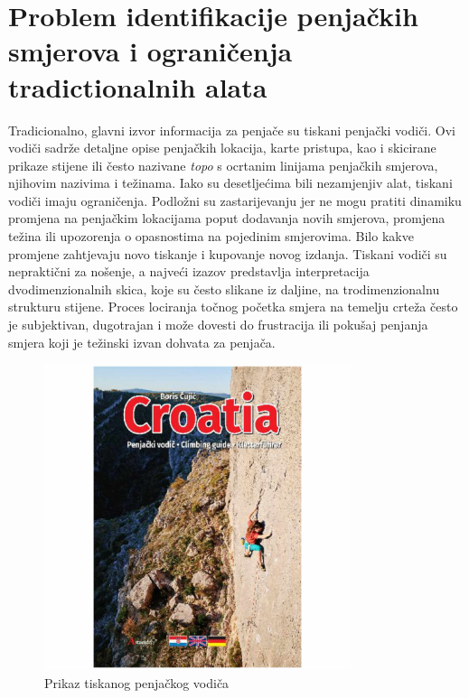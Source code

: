 \section{Problem identifikacije penjačkih smjerova i ograničenja tradictionalnih alata}

Tradicionalno, glavni izvor informacija za penjače su tiskani penjački vodiči. Ovi vodiči sadrže detaljne opise penjačkih lokacija, karte pristupa, kao i skicirane prikaze stijene ili često nazivane \textit{topo} s ocrtanim linijama penjačkih smjerova, njihovim nazivima i težinama. Iako su desetljećima bili nezamjenjiv alat, tiskani vodiči imaju ograničenja. 
Podložni su zastarijevanju jer ne mogu pratiti dinamiku promjena na penjačkim lokacijama poput dodavanja novih smjerova, promjena težina ili upozorenja o opasnostima na pojedinim smjerovima. Bilo kakve promjene zahtjevaju novo tiskanje i kupovanje novog izdanja. Tiskani vodiči su nepraktični za nošenje, a najveći izazov predstavlja interpretacija dvodimenzionalnih skica, koje su često slikane iz daljine, na trodimenzionalnu strukturu stijene. Proces lociranja točnog početka smjera na temelju crteža često je subjektivan, dugotrajan i može dovesti do frustracija ili pokušaj penjanja smjera koji je težinski izvan dohvata za penjača. 

\begin{figure}[H]
    \centering
    \includegraphics[width=0.8\textwidth]{images/uvod/tradicionalni_vodic.jpg}
    \caption{Prikaz tiskanog penjačkog vodiča}
\end{figure} 